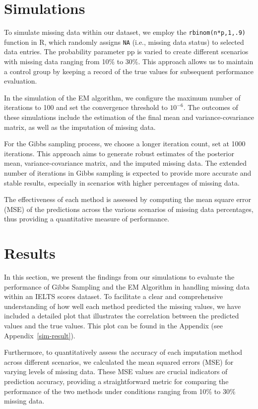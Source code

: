 \documentclass[12pt]{article}
\begin{document}

\section{Simulations}

To simulate missing data within our dataset, we employ the \texttt{rbinom(n*p,1,.9)} function in R, which randomly assigns \texttt{NA} (i.e., missing data status) to selected data entries. The probability parameter pp is varied to create different scenarios with missing data ranging from 10\% to 30\%. This approach allows us to maintain a control group by keeping a record of the true values for subsequent performance evaluation.

In the simulation of the EM algorithm, we configure the maximum number of iterations to 100 and set the convergence threshold to $10^{-6}$. The outcomes of these simulations include the estimation of the final mean and variance-covariance matrix, as well as the imputation of missing data.

For the Gibbs sampling process, we choose a longer iteration count, set at 1000 iterations. This approach aims to generate robust estimates of the posterior mean, variance-covariance matrix, and the imputed missing data. The extended number of iterations in Gibbs sampling is expected to provide more accurate and stable results, especially in scenarios with higher percentages of missing data.

The effectiveness of each method is assessed by computing the mean square error (MSE) of the predictions across the various scenarios of missing data percentages, thus providing a quantitative measure of performance.

\section{Results}

In this section, we present the findings from our simulations to evaluate the performance of Gibbs Sampling and the EM Algorithm in handling missing data within an IELTS scores dataset. To facilitate a clear and comprehensive understanding of how well each method predicted the missing values, we have included a detailed plot that illustrates the correlation between the predicted values and the true values. This plot can be found in the Appendix (see Appendix~\ref{sim-result}).

Furthermore, to quantitatively assess the accuracy of each imputation method across different scenarios, we calculated the mean squared errors (MSE) for varying levels of missing data. These MSE values are crucial indicators of prediction accuracy, providing a straightforward metric for comparing the performance of the two methods under conditions ranging from 10\% to 30\% missing data. 
\end{document}
